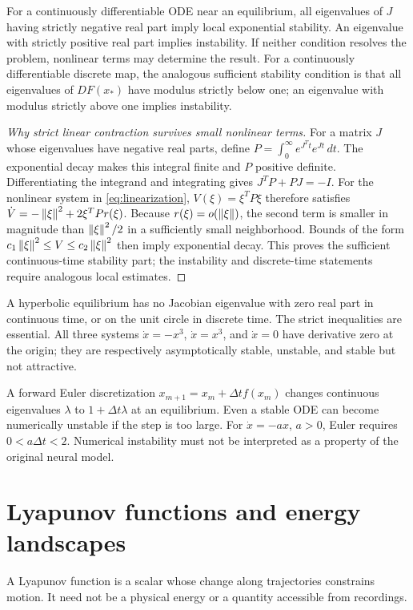 \begin{theorem}\label{thm:linear-stability}
For a continuously differentiable ODE near an equilibrium, all eigenvalues of $J$ having strictly negative real part imply local exponential stability. An eigenvalue with strictly positive real part implies instability. If neither condition resolves the problem, nonlinear terms may determine the result. For a continuously differentiable discrete map, the analogous sufficient stability condition is that all eigenvalues of $DF(x_*)$ have modulus strictly below one; an eigenvalue with modulus strictly above one implies instability.
\end{theorem}
\begin{proof}[Why strict linear contraction survives small nonlinear terms]
For a matrix $J$ whose eigenvalues have negative real parts, define
$P=\int_0^\infty e^{J^Tt}e^{Jt}\,dt$. The exponential decay makes this integral finite and $P$ positive definite. Differentiating the integrand and integrating gives $J^TP+PJ=-I$. For the nonlinear system in \eqref{eq:linearization}, $V(\xi)=\xi^TP\xi$ therefore satisfies
$\dot V=-\left\lVert \xi\right\rVert^2+2\xi^TPr(\xi)$. Because $r(\xi)=o(\left\lVert \xi\right\rVert)$, the second term is smaller in magnitude than $\left\lVert \xi\right\rVert^2/2$ in a sufficiently small neighborhood. Bounds of the form $c_1\left\lVert \xi\right\rVert^2\leq V\leq c_2\left\lVert \xi\right\rVert^2$ then imply exponential decay. This proves the sufficient continuous-time stability part; the instability and discrete-time statements require analogous local estimates.
\end{proof}

A hyperbolic equilibrium has no Jacobian eigenvalue with zero real part in continuous time, or on the unit circle in discrete time. The strict inequalities are essential. All three systems $\dot x=-x^3$, $\dot x=x^3$, and $\dot x=0$ have derivative zero at the origin; they are respectively asymptotically stable, unstable, and stable but not attractive.

A forward Euler discretization $x_{m+1}=x_m+\Delta t f(x_m)$ changes continuous eigenvalues $\lambda$ to $1+\Delta t\lambda$ at an equilibrium. Even a stable ODE can become numerically unstable if the step is too large. For $\dot x=-ax$, $a>0$, Euler requires $0<a\Delta t<2$. Numerical instability must not be interpreted as a property of the original neural model.

\section{Lyapunov functions and energy landscapes}
A Lyapunov function is a scalar whose change along trajectories constrains motion. It need not be a physical energy or a quantity accessible from recordings.

